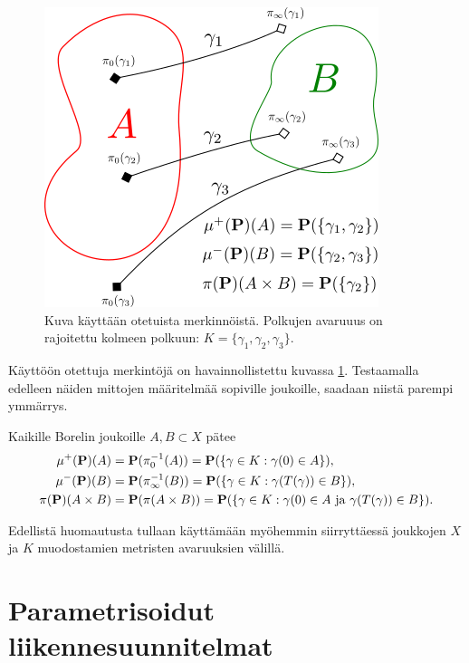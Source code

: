 \documentclass[12pt,oneside,a4paper]{amsbook} %
\begin{document}
\begin{figure}
    \centering
    \includegraphics[scale=0.8]{graphics/irrigating-irrigated-tp.png}
    \caption{Kuva käyttään otetuista merkinnöistä. Polkujen avaruuus on rajoitettu kolmeen polkuun: $K = \{\gamma_1, \gamma_2, \gamma_3\}$.}
    \label{fig:irrigated-irrigating-tp}
\end{figure}

Käyttöön otettuja merkintöjä on havainnollistettu kuvassa \ref{fig:irrigated-irrigating-tp}. Testaamalla edelleen näiden mittojen määritelmää sopiville joukoille, saadaan niistä parempi ymmärrys.

\begin{remark}
    Kaikille Borelin joukoille $A, B \subset X$ pätee
    \begin{align*}
        \mu^+(\P)(A) &= \P(\pi_0^{-1}(A)) = \P(\{\gamma \in K : \gamma(0) \in A\}), \\
        \mu^-(\P)(B) &= \P(\pi_\infty^{-1}(B)) = \P(\{\gamma \in K : \gamma(T(\gamma)) \in B\}), \\
        \pi(\P)(A\times B) &= \P(\pi(A\times B)) = \P(\{\gamma \in K: \gamma(0) \in A\text{ ja } \gamma(T(\gamma)) \in B\}).
    \end{align*}
\end{remark}

Edellistä huomautusta tullaan käyttämään myöhemmin siirryttäessä joukkojen $X$ ja $K$ muodostamien metristen avaruuksien välillä.

\section{Parametrisoidut liikennesuunnitelmat}
\end{document}
